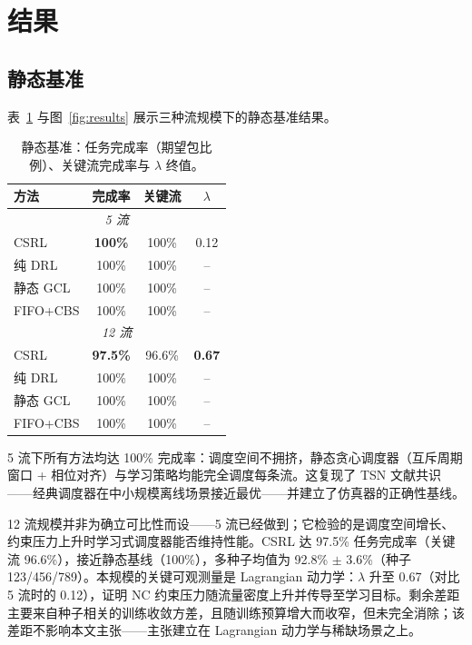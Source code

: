 \documentclass[UTF8]{ctexart}
\begin{document}
\section{结果}

\subsection{静态基准}

表~\ref{tab:static} 与图~\ref{fig:results} 展示三种流规模下的静态基准结果。

\begin{table}[t]
\centering
\caption{静态基准：任务完成率（期望包比例）、关键流完成率与 $\lambda$ 终值。}
\label{tab:static}
\begin{tabular}{lccc}
\hline
\textbf{方法} & \textbf{完成率} & \textbf{关键流} & $\lambda$ \\
\hline
\multicolumn{4}{c}{\textit{5 流}} \\
\hline
CSRL & \textbf{100\%} & 100\% & 0.12 \\
纯 DRL & 100\% & 100\% & -- \\
静态 GCL & 100\% & 100\% & -- \\
FIFO+CBS & 100\% & 100\% & -- \\
\hline
\multicolumn{4}{c}{\textit{12 流}} \\
\hline
CSRL & \textbf{97.5\%} & 96.6\% & \textbf{0.67} \\
纯 DRL & 100\% & 100\% & -- \\
静态 GCL & 100\% & 100\% & -- \\
FIFO+CBS & 100\% & 100\% & -- \\
\hline
\end{tabular}
\end{table}

5 流下所有方法均达 100\% 完成率：调度空间不拥挤，静态贪心调度器（互斥周期窗口 + 相位对齐）与学习策略均能完全调度每条流。这复现了 TSN 文献共识——经典调度器在中小规模离线场景接近最优——并建立了仿真器的正确性基线。

12 流规模并非为确立可比性而设——5 流已经做到；它检验的是调度空间增长、约束压力上升时学习式调度器能否维持性能。CSRL 达 97.5\% 任务完成率（关键流 96.6\%），接近静态基线（100\%），多种子均值为 92.8\% $\pm$ 3.6\%（种子 123/456/789）。本规模的关键可观测量是 Lagrangian 动力学：$\lambda$ 升至 0.67（对比 5 流时的 0.12），证明 NC 约束压力随流量密度上升并传导至学习目标。剩余差距主要来自种子相关的训练收敛方差，且随训练预算增大而收窄，但未完全消除；该差距不影响本文主张——主张建立在 Lagrangian 动力学与稀缺场景之上。
\end{document}
